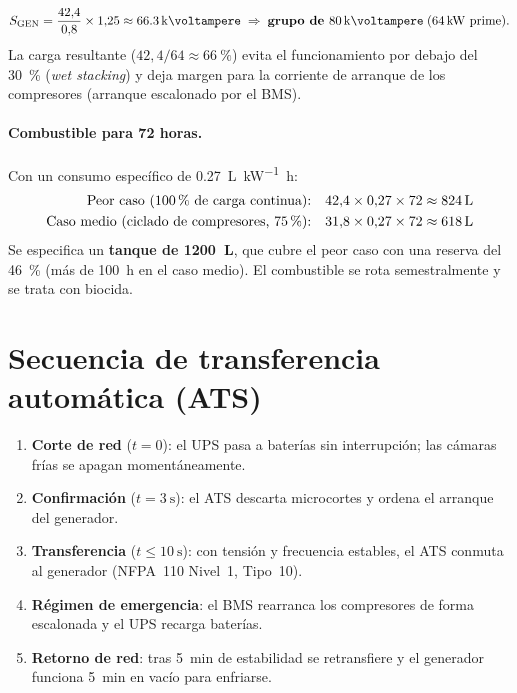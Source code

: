 \documentclass[11pt,a4paper,oneside]{report}
\begin{document}
\[
S_{\text{GEN}}=\frac{42{,}4}{0{,}8}\times1{,}25\approx\SI{66,3}{\kilo\voltampere}
\;\Rightarrow\;\textbf{grupo de } \SI{80}{\kilo\voltampere}\;(\SI{64}{\kilo\watt}\text{ prime}).
\]
La carga resultante ($42{,}4/64\approx\SI{66}{\percent}$) evita el funcionamiento por
debajo del \SI{30}{\percent} (\emph{wet stacking}) y deja margen para la corriente de
arranque de los compresores (arranque escalonado por el BMS).

\paragraph{Combustible para 72 horas.} Con un consumo específico de
\SI{0,27}{\liter\per\kilo\watt\hour}:
\begin{align*}
\text{Peor caso (100\,\% de carga continua):}\quad & 42{,}4\times0{,}27\times72\approx\SI{824}{\liter}\\
\text{Caso medio (ciclado de compresores, 75\,\%):}\quad & 31{,}8\times0{,}27\times72\approx\SI{618}{\liter}
\end{align*}
Se especifica un \textbf{tanque de \SI{1200}{\liter}}, que cubre el peor caso con una reserva
del \SI{46}{\percent} (más de \SI{100}{\hour} en el caso medio). El combustible se rota
semestralmente y se trata con biocida.

\section{Secuencia de transferencia automática (ATS)}

\begin{enumerate}
  \item \textbf{Corte de red} ($t=0$): el UPS pasa a baterías sin interrupción; las cámaras
  frías se apagan momentáneamente.
  \item \textbf{Confirmación} ($t=\SI{3}{\second}$): el ATS descarta microcortes y ordena el
  arranque del generador.
  \item \textbf{Transferencia} ($t\leq\SI{10}{\second}$): con tensión y frecuencia estables,
  el ATS conmuta al generador (NFPA~110 Nivel~1, Tipo~10).
  \item \textbf{Régimen de emergencia}: el BMS rearranca los compresores de forma escalonada
  y el UPS recarga baterías.
  \item \textbf{Retorno de red}: tras \SI{5}{\minute} de estabilidad se retransfiere y el
  generador funciona \SI{5}{\minute} en vacío para enfriarse.
\end{enumerate}
\end{document}
